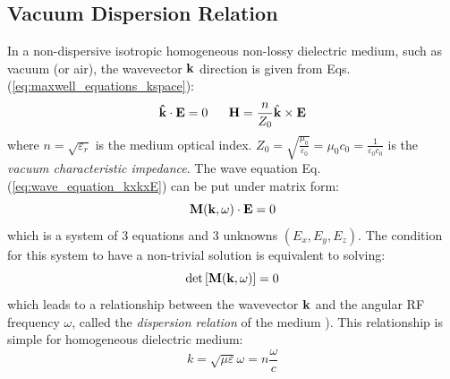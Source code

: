 \subsection{Vacuum Dispersion Relation}
In a non-dispersive isotropic homogeneous non-lossy dielectric medium, such as vacuum (or air), the wavevector ${\mathbf k}$ direction is given from Eqs.(\ref{eq:maxwell_equations_kspace}):
\begin{equation}
\mathbf{\hat{k}}\cdot\mathbf{E}=0
\;\;\;\;\;\;
\mathbf{H}=\frac{n}{Z_{0}}\hat{{\mathbf k}}\times\mathbf{E}\label{eq:vecteur_onde_vide}
\end{equation}
where $n=\sqrt{\varepsilon_{r}}$ is the medium optical index. $Z_{0}=\sqrt{\frac{\mu_{0}}{\varepsilon_{0}}}=\mu_{0}c_{0}=\frac{1}{\varepsilon_{0}c_{0}}$ is the \emph{vacuum characteristic impedance}. The wave equation Eq.(\ref{eq:wave_equation_kxkxE}) can be put under matrix form:
\begin{equation}
\mathbf{M}({\mathbf k}, \omega) \cdot {\mathbf E} = 0
\end{equation}
which is a system of 3 equations and 3 unknowns $(E_{x},E_{y},E_{z})$. The condition for this system to have a non-trivial solution is equivalent to solving:
\begin{equation}
\det\left[\mathbf{M}({\mathbf k}, \omega)\right] =  0
\end{equation}
which leads to a relationship between the wavevector ${\mathbf k}$ and the angular RF frequency $\omega$, called the \textit{dispersion relation} of the medium \cite[§4]{rothwell2018}). This relationship is simple for homogeneous dielectric medium:
\begin{equation}
k = \sqrt{\mu\varepsilon}\omega = n \frac{\omega}{c}
\end{equation}


